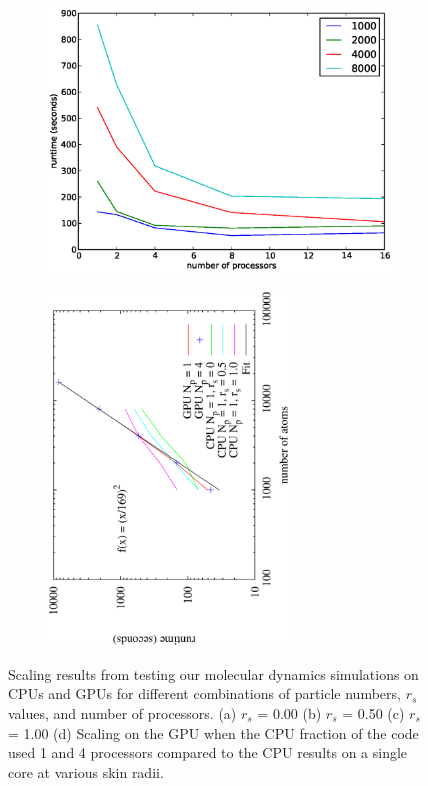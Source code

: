 \documentclass[12pt]{article}
\begin{document}
\begin{figure}[H]
\begin{subfigure}{0.5\textwidth}
	\includegraphics[width=\textwidth]{scalingtiger_rs_100}
	\caption{}
	\end{subfigure}
	\begin{subfigure}{0.5\textwidth}
	\includegraphics[width=0.7\textwidth, angle=-90]{gpu_time.eps}
	\caption{}
	\end{subfigure}
	\caption{Scaling results from testing our molecular dynamics simulations on CPUs and GPUs for different combinations of particle numbers, $r_{s}$ values, and number of processors. (a) $r_{s}$ = 0.00 (b) $r_{s}$ = 0.50 (c) $r_{s}$ = 1.00 (d) Scaling on the GPU when the CPU fraction of the code used 1 and 4 processors compared to the CPU results on a single core at various skin radii.}
	\label{fig:scaling_compare}
\end{figure}
\end{document}
